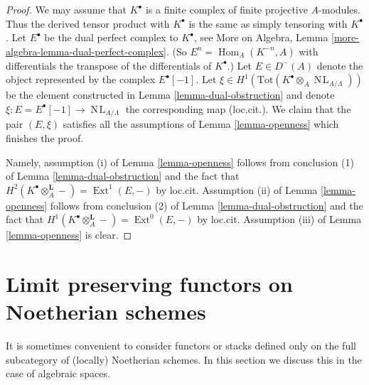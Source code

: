 \documentclass{stacks-project}
\theoremstyle{plain}
\theoremstyle{definition}
\theoremstyle{remark}
\numberwithin{equation}{subsection}
\def\Hom{\mathop{\mathrm{Hom}}\nolimits}
\def\Ext{\mathop{\mathrm{Ext}}\nolimits}
\def\NL{\mathop{N\!L}\nolimits}
\begin{document}
\begin{proof}
We may assume that $K^\bullet$ is a finite complex of finite projective
$A$-modules. Thus the derived tensor product with $K^\bullet$ is the
same as simply tensoring with $K^\bullet$. Let
$E^\bullet$ be the dual perfect complex to $K^\bullet$, see
More on Algebra, Lemma \ref{more-algebra-lemma-dual-perfect-complex}.
(So $E^n = \Hom_A(K^{-n}, A)$ with differentials the transpose of the
differentials of $K^\bullet$.) Let $E \in D^{-}(A)$ denote the
object represented by the complex $E^\bullet[-1]$.
Let $\xi \in H^1(\text{Tot}(K^\bullet \otimes_A \NL_{A/\Lambda}))$
be the element constructed in Lemma \ref{lemma-dual-obstruction}
and denote $\xi : E = E^\bullet[-1] \to \NL_{A/\Lambda}$ the corresponding
map (loc.cit.). We claim that the pair $(E, \xi)$ satisfies all the
assumptions of Lemma \ref{lemma-openness} which finishes the proof.

\medskip\noindent
Namely, assumption (i) of Lemma \ref{lemma-openness} follows from conclusion
(1) of Lemma \ref{lemma-dual-obstruction}
and the fact that $H^2(K^\bullet \otimes_A^\mathbf{L} -) =
\Ext^1(E, -)$ by loc.cit. Assumption (ii) of
Lemma \ref{lemma-openness} follows from conclusion (2) of
Lemma \ref{lemma-dual-obstruction}
and the fact that $H^1(K^\bullet \otimes_A^\mathbf{L} -) =
\Ext^0(E, -)$ by loc.cit. Assumption (iii) of Lemma \ref{lemma-openness}
is clear.
\end{proof}







\section{Limit preserving functors on Noetherian schemes}
\label{section-noetherian}

\noindent
It is sometimes convenient to consider functors or stacks defined only
on the full subcategory of (locally) Noetherian schemes. In this section
we discuss this in the case of algebraic spaces.
\end{document}
